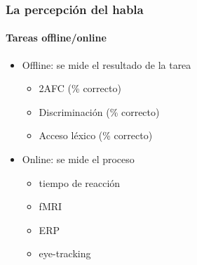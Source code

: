 \documentclass{beamer}
\begin{document}
\begin{frame} 
	\frametitle{La percepción del habla}
	\framesubtitle{Tareas offline/online}
	
	\begin{itemize}
		\item Offline: se mide el resultado de la tarea
		\begin{itemize}
			\item 2AFC (\% correcto)
			\item Discriminación (\% correcto)
			\item Acceso léxico (\% correcto)
		\end{itemize} 
		\vspace{.2in}
		\item Online: se mide el proceso
		\begin{itemize}
			\item tiempo de reacción
			\item fMRI
			\item ERP
			\item eye-tracking
		\end{itemize}
	\end{itemize}
\end{frame}
\end{document}
